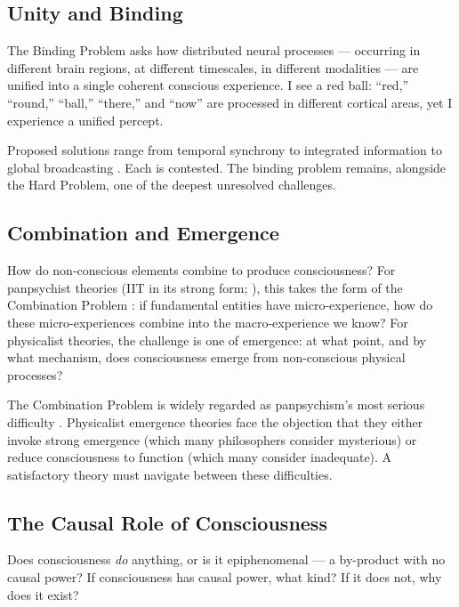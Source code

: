 \documentclass[12pt]{article}
\begin{document}
\subsection{Unity and Binding}


The Binding Problem \citep{Treisman1996,Revonsuo1999} asks how distributed neural processes --- occurring in different brain regions, at different timescales, in different modalities --- are unified into a single coherent conscious experience. I see a red ball: ``red,'' ``round,'' ``ball,'' ``there,'' and ``now'' are processed in different cortical areas, yet I experience a unified percept.

Proposed solutions range from temporal synchrony \citep{Gray1989,Singer1995,Fries2005,Fries2015} to integrated information \citep{Tononi2004} to global broadcasting \citep{Baars1988}. Each is contested. The binding problem remains, alongside the Hard Problem, one of the deepest unresolved challenges.


\subsection{Combination and Emergence}


How do non-conscious elements combine to produce consciousness? For panpsychist theories (IIT in its strong form; \citealp{Goff2019,Strawson2006}), this takes the form of the Combination Problem \citep{James1890,Chalmers2016}: if fundamental entities have micro-experience, how do these micro-experiences combine into the macro-experience we know? For physicalist theories, the challenge is one of emergence: at what point, and by what mechanism, does consciousness emerge from non-conscious physical processes?

The Combination Problem is widely regarded as panpsychism's most serious difficulty \citep{Chalmers2016,Coleman2014}. Physicalist emergence theories face the objection that they either invoke strong emergence (which many philosophers consider mysterious) or reduce consciousness to function (which many consider inadequate). A satisfactory theory must navigate between these difficulties.


\subsection{The Causal Role of Consciousness}


Does consciousness \emph{do} anything, or is it epiphenomenal --- a by-product with no causal power? If consciousness has causal power, what kind? If it does not, why does it exist?
\end{document}
